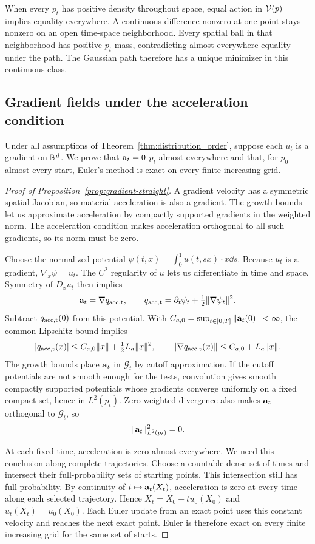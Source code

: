 When every $p_t$ has positive density throughout space, equal action in $\mathcal V(p)$ implies equality everywhere. A continuous difference nonzero at one point stays nonzero on an open time-space neighborhood. Every spatial ball in that neighborhood has positive $p_t$ mass, contradicting almost-everywhere equality under the path. The Gaussian path therefore has a unique minimizer in this continuous class.

\subsection{Gradient fields under the acceleration condition}
\label{app:gradient}
Under all assumptions of Theorem~\ref{thm:distribution_order}, suppose each $u_t$ is a gradient on $\mathbb R^d$. We prove that $\mathbf a_t=0$ $p_t$-almost everywhere and that, for $p_0$-almost every start, Euler's method is exact on every finite increasing grid.

\begin{proof}[Proof of Proposition~\ref{prop:gradient-straight}]
\label{proof:gradient-straight}
A gradient velocity has a symmetric spatial Jacobian, so material acceleration is also a gradient. The growth bounds let us approximate acceleration by compactly supported gradients in the weighted norm. The acceleration condition makes acceleration orthogonal to all such gradients, so its norm must be zero.

Choose the normalized potential
$\psi(t,x)=\int_0^1 u(t,sx)\cdot x\dd s$.
Because $u_t$ is a gradient, $\nabla_x\psi=u_t$. The $C^2$ regularity of $u$ lets us differentiate in time and space. Symmetry of $D_xu_t$ then implies
\[
 \mathbf a_t=\nabla q_{\rm acc,t},\qquad
 q_{\rm acc,t}=\partial_t\psi_t+\tfrac12\|\nabla\psi_t\|^2.
\]
Subtract $q_{\rm acc,t}(0)$ from this potential. With
$C_{a,0}=\sup_{t\in[0,T]}\|\mathbf a_t(0)\|<\infty$, the common Lipschitz bound implies
\[
 |q_{\rm acc,t}(x)|\le C_{a,0}\|x\|+\tfrac12L_a\|x\|^2,
 \qquad \|\nabla q_{\rm acc,t}(x)\|\le C_{a,0}+L_a\|x\|.
\]
The growth bounds place $\mathbf a_t$ in $\mathcal G_t$ by cutoff approximation. If the cutoff potentials are not smooth enough for the tests, convolution gives smooth compactly supported potentials whose gradients converge uniformly on a fixed compact set, hence in $L^2(p_t)$. Zero weighted divergence also makes $\mathbf a_t$ orthogonal to $\mathcal G_t$, so
\[
 \|\mathbf a_t\|_{L^2(p_t)}^2=0.
\]

At each fixed time, acceleration is zero almost everywhere. We need this conclusion along complete trajectories. Choose a countable dense set of times and intersect their full-probability sets of starting points. This intersection still has full probability. By continuity of $t\mapsto\mathbf a_t(X_t)$, acceleration is zero at every time along each selected trajectory. Hence $X_t=X_0+t u_0(X_0)$ and $u_t(X_t)=u_0(X_0)$. Each Euler update from an exact point uses this constant velocity and reaches the next exact point. Euler is therefore exact on every finite increasing grid for the same set of starts.
\end{proof}

